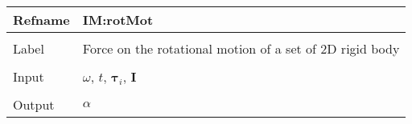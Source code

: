 \documentclass[12pt]{article}
\begin{document}
\vspace{\baselineskip}
\noindent
\begin{minipage}{\textwidth}
\begin{tabular}{>{\raggedright}p{}>{\raggedright\arraybackslash}p{}}
\toprule \textbf{Refname} & \textbf{IM:rotMot}
\label{IM:rotMot}
\\ \midrule \\
Label & Force on the rotational motion of a set of 2D rigid body
        
\\ \midrule \\
Input & $ω$, $t$, ${\mathbf{τ}_{i}}$, $\mathbf{I}$
        
\\ \midrule \\
Output & $α$
         

\end{tabular}
\end{minipage}
\end{document}
